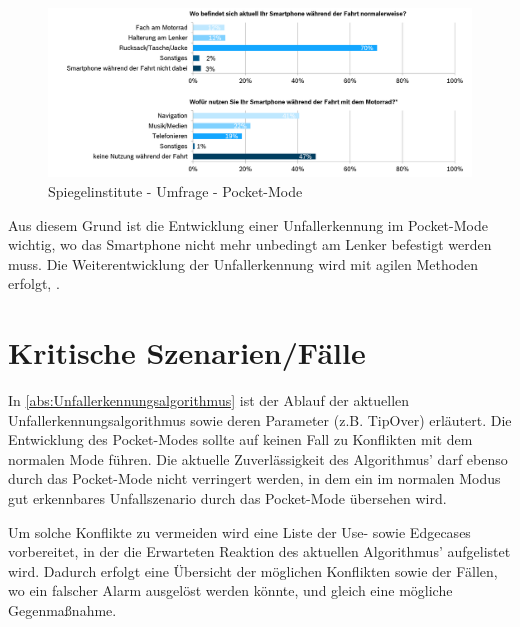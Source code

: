 \begin{figure}[H]
	\centering
	\includegraphics[width=\linewidth]{Bilder/SpiegelUmfragePocketMode.png}
	\caption{Spiegelinstitute - Umfrage - Pocket-Mode}
	\label{fig:CalimotoUmfragePocketMode}
\end{figure}

Aus diesem Grund ist die Entwicklung einer Unfallerkennung im Pocket-Mode wichtig, wo das Smartphone nicht mehr unbedingt am Lenker befestigt werden muss. Die Weiterentwicklung der Unfallerkennung wird mit agilen Methoden erfolgt, .

\section{Kritische Szenarien/Fälle}
In \autoref{abs:Unfallerkennungsalgorithmus} ist der Ablauf der aktuellen Unfallerkennungsalgorithmus sowie deren Parameter (z.B. TipOver) erläutert. Die Entwicklung des Pocket-Modes sollte auf keinen Fall zu Konflikten mit dem normalen Mode führen. Die aktuelle Zuverlässigkeit des Algorithmus' darf ebenso durch das Pocket-Mode nicht verringert werden, in dem ein im normalen Modus gut erkennbares Unfallszenario durch das Pocket-Mode übersehen wird.

Um solche Konflikte zu vermeiden wird eine Liste der Use- sowie Edgecases vorbereitet, in der die Erwarteten Reaktion des aktuellen Algorithmus' aufgelistet wird. Dadurch erfolgt eine Übersicht der möglichen Konflikten sowie der Fällen, wo ein falscher Alarm ausgelöst werden könnte, und gleich eine mögliche Gegenmaßnahme.

